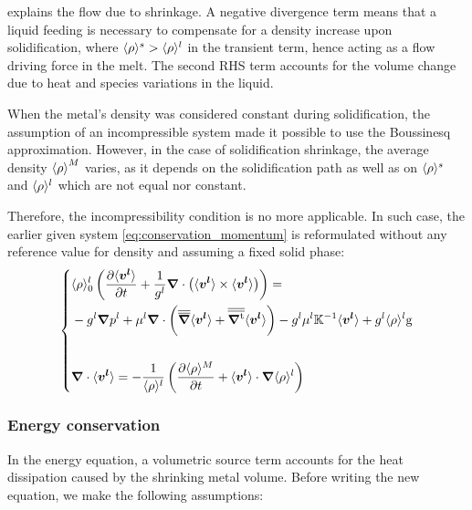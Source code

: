  explains the flow due to shrinkage. 
A negative divergence term means that a liquid feeding 
is necessary to compensate for a density increase upon solidification, where $\langle \rho \rangle^s > \langle \rho \rangle^l$ in the transient term, 
hence acting as a flow driving force in the melt.
The second RHS term accounts for the volume change 
due to heat and species variations in the liquid.

When the metal's density was considered constant during solidification, 
the assumption of an incompressible system made it possible to
use the Boussinesq approximation. However, in the case of solidification shrinkage, 
the average density ${\langle \rho \rangle}^M$ varies, as it depends on the solidification 
path as well as on $\langle \rho \rangle^s$ and $\langle \rho \rangle^l$ which are not equal nor constant.

Therefore, the incompressibility condition is no more applicable. In such case, 
the earlier given system \cref{eq:conservation_momentum} is reformulated without 
any reference value for density and assuming a fixed solid phase:
\begin{equation}
\label{eq:momentum_balance_metal}
   \left\{
   \begin{aligned}
      & \langle \rho \rangle^l_0 \left( \frac{\partial  \langle \boldsymbol{v^l} \rangle }{\partial t}  + \frac{1}{{g^l}} \boldsymbol{\nabla} \cdot \left( \langle \boldsymbol{v^l} \rangle \times \langle \boldsymbol{v^l} \rangle \right) \right) = \\
	  &- {g^l}\boldsymbol{\nabla} {p^l} + \mu^l \boldsymbol{\nabla} \cdot \left( {\overline{\overline{\boldsymbol{\nabla}}}} \langle \boldsymbol{v^l} \rangle + {\overline{\overline{\boldsymbol{\nabla^\text{t}}}}} \langle \boldsymbol{v^l} \rangle \right)
	  - {g^l} \mu^l \mathbb{K}^{-1} \langle \boldsymbol{v^l} \rangle + {g^l} \langle \rho \rangle^l \boldsymbol{\text{g}}\\ \\
      & \boldsymbol{\nabla} \cdot \langle \boldsymbol{v^l} \rangle = -\frac{1}{\langle \rho \rangle^l} \left( \frac{\partial \langle \rho \rangle^M}{\partial t}  + \langle \boldsymbol{v^l} \rangle \cdot  \boldsymbol{\nabla} \langle \rho \rangle^l \right)
    \end{aligned}
    \right.
\end{equation}
\subsubsection{Energy conservation}
In the energy equation, a volumetric source term accounts for the heat dissipation 
caused by the shrinking metal volume. Before writing the new equation, we make the following assumptions:

